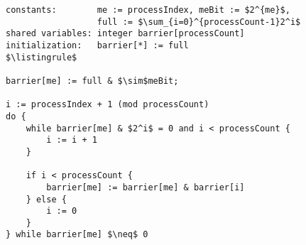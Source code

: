 \begin{lstlisting}[mathescape]
constants:        me := processIndex, meBit := $2^{me}$,
                  full := $\sum_{i=0}^{processCount-1}2^i$
shared variables: integer barrier[processCount]
initialization:   barrier[*] := full
$\listingrule$

barrier[me] := full & $\sim$meBit;

i := processIndex + 1 (mod processCount)
do {
	while barrier[me] & $2^i$ = 0 and i < processCount {
		i := i + 1
	}

	if i < processCount {
		barrier[me] := barrier[me] & barrier[i]
	} else {
		i := 0
	}
} while barrier[me] $\neq$ 0
\end{lstlisting}
